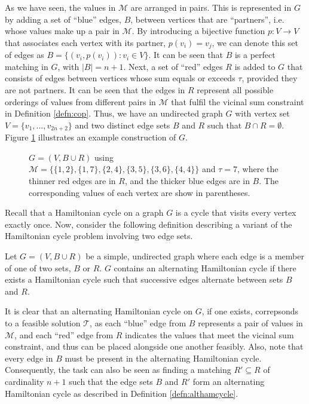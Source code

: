 \documentclass[runningheads]{llncs}
\begin{document}
As we have seen, the values in $\mathcal{M}$ are arranged in pairs. This is represented in $G$ by adding a set of ``blue'' edges, $B$, between vertices that are ``partners'', i.e. whose values make up a pair in $\mathcal{M}$. By introducing a bijective function $p: V \to V$ that associates each vertex with its partner, $p(v_i) = v_j$, we can denote this set of edges as $B = \{(v_i, p(v_i)) : v_i \in V\}$. It can be seen that $B$ is a perfect matching in $G$, with $|B| = n+1$. Next, a set of ``red'' edges $R$ is added to $G$ that consists of edges between vertices whose sum equals or exceeds $\tau$, provided they are not partners. It can be seen that the edges in $R$ represent all possible orderings of values from different pairs in $\mathcal{M}$ that fulfil the vicinal sum constraint in Definition \ref{defn:cop}. Thus, we have an undirected graph $G$ with vertex set $V = \{v_1, ..., v_{2n+2}\}$ and two distinct edge sets $B$ and $R$ such that $B \cap R = \emptyset$. Figure \ref{fig:threshold} illustrates an example construction of $G$. 
\begin{figure}[h!]	
\centering
	
	\caption{$G = (V, B \cup R)$ using $\mathcal{M} = \{\{1,2\}, \{1,7\}, \{2,4\}, \{3,5\}, \{3,6\}, \{4,4\}\}$ and $\tau = 7$, where the thinner red edges are in $R$, and the thicker blue edges are in $B$. The corresponding values of each vertex are show in parentheses.}
	\label{fig:threshold}
\end{figure}

\noindent Recall that a Hamiltonian cycle on a graph $G$ is a cycle that visits every vertex exactly once. Now, consider the following definition describing a variant of the Hamiltonian cycle problem involving two edge sets.

\begin{definition}
	\label{defn:althamcycle}
	Let $G = (V, B \cup R)$ be a simple, undirected graph where each edge is a member of one of two sets, $B$ or $R$. $G$ contains an alternating Hamiltonian cycle if there exists a Hamiltonian cycle such that successive edges alternate between sets $B$ and $R$.
\end{definition}

\noindent It is clear that an alternating Hamiltonian cycle on $G$, if one exists, correpsonds to a feasible solution $\mathcal{T}$, as each ``blue'' edge from $B$ represents a pair of values in $\mathcal{M}$, and each ``red'' edge from $R$ indicates the values that meet the vicinal sum constraint, and thus can be placed alongside one another feasibly. Also, note that every edge in $B$ must be present in the alternating Hamiltonian cycle. Consequently, the task can also be seen as finding a matching $R' \subseteq R$ of cardinality $n+1$ such that the edge sets $B$ and $R'$ form an alternating Hamiltonian cycle as described in Definition \ref{defn:althamcycle}. 
\end{document}

